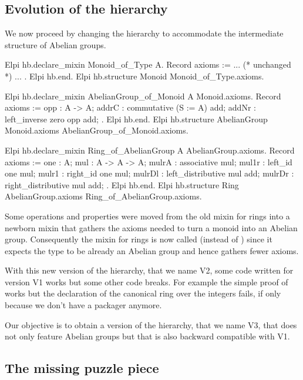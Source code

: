 \documentclass[a4paper,UKenglish,cleveref, autoref]{lipics-v2019}
\newcommand{\mixin}{mixin}
\newcommand{\packager}{packager}
\theoremstyle{implem}
\theoremstyle{implem}
\theoremstyle{axiom}
\theoremstyle{abscommand}
\theoremstyle{command}
\begin{document}
\subsection{Evolution of the hierarchy}

We now proceed by changing the hierarchy to accommodate the intermediate
structure of Abelian groups.

\begin{coqcode}
Elpi hb.declare_mixin Monoid_of_Type A.
  Record axioms := { ... (* unchanged *) ... }.
Elpi hb.end.
Elpi hb.structure Monoid Monoid_of_Type.axioms.

Elpi hb.declare_mixin AbelianGroup_of_Monoid A Monoid.axioms.
  Record axioms := {
    opp : A -> A;
    addrC : commutative (S := A) add;
    addNr : left_inverse zero opp add;
  }.
Elpi hb.end.
Elpi hb.structure AbelianGroup Monoid.axioms AbelianGroup_of_Monoid.axioms.

Elpi hb.declare_mixin Ring_of_AbelianGroup A AbelianGroup.axioms.
  Record axioms := {
    one : A;
    mul : A -> A -> A;
    mulrA : associative mul;
    mul1r : left_id one mul;
    mulr1 : right_id one mul;
    mulrDl : left_distributive mul add;
    mulrDr : right_distributive mul add;
  }.
Elpi hb.end.
Elpi hb.structure Ring AbelianGroup.axioms Ring_of_AbelianGroup.axioms.
\end{coqcode}

Some operations and properties were moved from the old \mixin{} for rings
into a newborn \mixin{}  that gathers the
axioms needed to turn a monoid into an Abelian group. Consequently the \mixin{}
for rings is now called  (instead of )
since it expects the type  to be already an Abelian group and hence
gathers fewer axioms.

With this new version of the hierarchy, that we name V2, some code written
for version V1 works but some other code breaks.
For example the simple proof of  works
but the declaration of the canonical ring over the integers fails, if only
because we don't have a  \packager{} anymore.

Our objective is to obtain a version of the hierarchy, that we name V3, that does
not only feature Abelian groups but that is also backward compatible
with V1.

\subsection{The missing puzzle piece}
\end{document}
